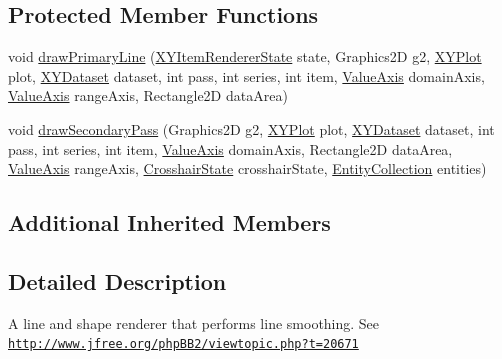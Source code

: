 \subsection*{Protected Member Functions}
\begin{DoxyCompactItemize}
\item 
void \mbox{\hyperlink{classorg_1_1jfree_1_1experimental_1_1chart_1_1renderer_1_1xy_1_1_x_y_smooth_line_and_shape_renderer_af87cbfac275f93906617bcb4e56adad6}{draw\+Primary\+Line}} (\mbox{\hyperlink{classorg_1_1jfree_1_1chart_1_1renderer_1_1xy_1_1_x_y_item_renderer_state}{X\+Y\+Item\+Renderer\+State}} state, Graphics2D g2, \mbox{\hyperlink{classorg_1_1jfree_1_1chart_1_1plot_1_1_x_y_plot}{X\+Y\+Plot}} plot, \mbox{\hyperlink{interfaceorg_1_1jfree_1_1data_1_1xy_1_1_x_y_dataset}{X\+Y\+Dataset}} dataset, int pass, int series, int item, \mbox{\hyperlink{classorg_1_1jfree_1_1chart_1_1axis_1_1_value_axis}{Value\+Axis}} domain\+Axis, \mbox{\hyperlink{classorg_1_1jfree_1_1chart_1_1axis_1_1_value_axis}{Value\+Axis}} range\+Axis, Rectangle2D data\+Area)
\item 
void \mbox{\hyperlink{classorg_1_1jfree_1_1experimental_1_1chart_1_1renderer_1_1xy_1_1_x_y_smooth_line_and_shape_renderer_aa41e38a75a134a6ae148fb15278aac0f}{draw\+Secondary\+Pass}} (Graphics2D g2, \mbox{\hyperlink{classorg_1_1jfree_1_1chart_1_1plot_1_1_x_y_plot}{X\+Y\+Plot}} plot, \mbox{\hyperlink{interfaceorg_1_1jfree_1_1data_1_1xy_1_1_x_y_dataset}{X\+Y\+Dataset}} dataset, int pass, int series, int item, \mbox{\hyperlink{classorg_1_1jfree_1_1chart_1_1axis_1_1_value_axis}{Value\+Axis}} domain\+Axis, Rectangle2D data\+Area, \mbox{\hyperlink{classorg_1_1jfree_1_1chart_1_1axis_1_1_value_axis}{Value\+Axis}} range\+Axis, \mbox{\hyperlink{classorg_1_1jfree_1_1chart_1_1plot_1_1_crosshair_state}{Crosshair\+State}} crosshair\+State, \mbox{\hyperlink{interfaceorg_1_1jfree_1_1chart_1_1entity_1_1_entity_collection}{Entity\+Collection}} entities)
\end{DoxyCompactItemize}
\subsection*{Additional Inherited Members}


\subsection{Detailed Description}
A line and shape renderer that performs line smoothing. See \href{http://www.jfree.org/phpBB2/viewtopic.php?t=20671}{\tt http\+://www.\+jfree.\+org/php\+B\+B2/viewtopic.\+php?t=20671}


